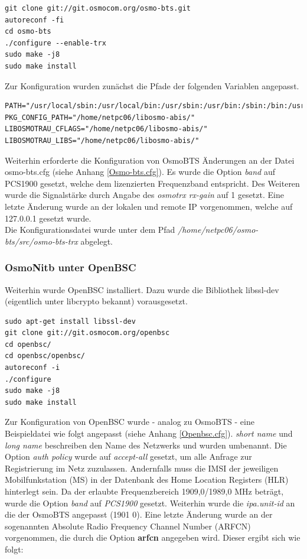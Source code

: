 \begin{lstlisting}
git clone git://git.osmocom.org/osmo-bts.git
autoreconf -fi
cd osmo-bts
./configure --enable-trx
sudo make -j8
sudo make install
\end{lstlisting}

Zur Konfiguration wurden zunächst die Pfade der folgenden Variablen angepasst.

\begin{lstlisting}
PATH="/usr/local/sbin:/usr/local/bin:/usr/sbin:/usr/bin:/sbin:/bin:/usr/games:/usr/local/games"
PKG_CONFIG_PATH="/home/netpc06/libosmo-abis/"
LIBOSMOTRAU_CFLAGS="/home/netpc06/libosmo-abis/"
LIBOSMOTRAU_LIBS="/home/netpc06/libosmo-abis/"
\end{lstlisting}

Weiterhin erforderte die Konfiguration von OsmoBTS Änderungen an der Datei osmo-bts.cfg (siehe Anhang \ref{Osmo-bts.cfg}). Es wurde die Option \textit{band} auf PCS1900 gesetzt, welche dem lizenzierten Frequenzband entspricht. Des Weiteren wurde    die Signalstärke durch Angabe des \textit{osmotrx rx-gain} auf 1 gesetzt. Eine letzte Änderung wurde an der lokalen und remote IP vorgenommen, welche auf 127.0.0.1 gesetzt wurde. \\

Die Konfigurationsdatei wurde unter dem Pfad \textit{/home/netpc06/osmo-bts/src/osmo-bts-trx} abgelegt. 

\subsubsection{OsmoNitb unter OpenBSC}
Weiterhin wurde OpenBSC installiert. Dazu wurde die Bibliothek libssl-dev (eigentlich unter libcrypto bekannt) vorausgesetzt.

\begin{lstlisting}
sudo apt-get install libssl-dev
git clone git://git.osmocom.org/openbsc
cd openbsc/
cd openbsc/openbsc/
autoreconf -i
./configure 
sudo make -j8
sudo make install
\end{lstlisting}

Zur Konfiguration von OpenBSC wurde - analog zu OsmoBTS - eine Beispieldatei wie folgt angepasst (siehe Anhang \ref{Openbsc.cfg}). \textit{short name} und \textit{long name} beschreiben den Name des Netzwerks und wurden umbenannt. Die Option \textit{auth policy} wurde auf \textit{accept-all} gesetzt, um alle Anfrage zur Registrierung im Netz zuzulassen. Andernfalls muss die IMSI der jeweiligen Mobilfunkstation (MS) in der Datenbank des Home Location Registers (HLR) hinterlegt sein. Da der erlaubte Frequenzbereich 1909,0/1989,0 MHz beträgt, wurde die Option \textit{band} auf \textit{PCS1900} gesetzt. Weiterhin wurde die \textit{ipa.unit-id} an die der OsmoBTS angepasst (1901 0). Eine letzte Änderung wurde an der sogenannten Absolute Radio Frequency Channel Number (ARFCN) vorgenommen, die durch die Option \textbf{arfcn} angegeben wird. Dieser ergibt sich wie folgt:

